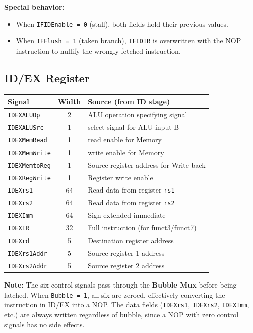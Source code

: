 \documentclass[12pt,a4paper]{article}
\begin{document}
\textbf{Special behavior:}
\begin{itemize}
    \item When \texttt{IFIDEnable = 0} (stall), both fields hold their previous values.
    \item When \texttt{IFFlush = 1} (taken branch), \texttt{IFIDIR} is overwritten with the NOP instruction to nullify the wrongly fetched instruction.
\end{itemize}

\subsection{ID/EX Register}
\begin{center}
\begin{tabular}{lcp{7cm}}
    \toprule
    \textbf{Signal} & \textbf{Width} & \textbf{Source (from ID stage)} \\
    \midrule
    \texttt{IDEXALUOp} & 2 & ALU operation specifying signal \\
    \texttt{IDEXALUSrc} & 1 & select signal for ALU input B \\
    \texttt{IDEXMemRead} & 1 & read enable for Memory  \\
    \texttt{IDEXMemWrite} & 1 & write enable for Memory \\
    \texttt{IDEXMemtoReg} & 1 & Source register address for Write-back \\
    \texttt{IDEXRegWrite} & 1 & Register write enable \\
    \midrule
    \texttt{IDEXrs1} & 64 & Read data from register \texttt{rs1} \\
    \texttt{IDEXrs2} & 64 & Read data from register \texttt{rs2} \\
    \texttt{IDEXImm} & 64 & Sign-extended immediate \\
    \texttt{IDEXIR} & 32 & Full instruction (for funct3/funct7) \\
    \texttt{IDEXrd} & 5 & Destination register address \\
    \texttt{IDEXrs1Addr} & 5 & Source register 1 address \\
    \texttt{IDEXrs2Addr} & 5 & Source register 2 address \\
    \bottomrule
\end{tabular}
\end{center}

\textbf{Note:} The six control signals pass through the \textbf{Bubble Mux} before being latched.
When \texttt{Bubble = 1}, all six are zeroed, effectively converting the instruction in ID/EX into a NOP.
The data fields (\texttt{IDEXrs1}, \texttt{IDEXrs2}, \texttt{IDEXImm}, etc.) are always written regardless of bubble, since a NOP with zero control signals has no side effects.
\end{document}
